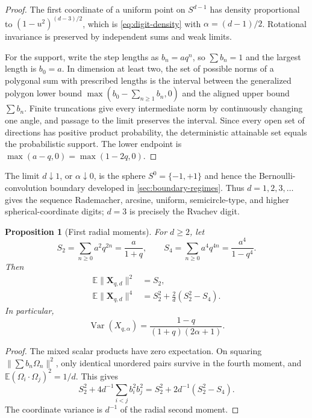 \documentclass[11pt]{article}
\newtheorem{proposition}[theorem]{Proposition}
\theoremstyle{definition}
\theoremstyle{remark}
\newcommand{\E}{\mathbb{E}}
\newcommand{\Var}{\operatorname{Var}}
\begin{document}
\begin{proof}
The first coordinate of a uniform point on \(S^{d-1}\) has density
proportional to \((1-u^2)^{(d-3)/2}\), which is
\eqref{eq:digit-density} with \(\alpha=(d-1)/2\).  Rotational invariance is
preserved by independent sums and weak limits.

For the support, write the step lengths as \(b_n=aq^n\), so
\(\sum b_n=1\) and the largest length is \(b_0=a\).  In dimension at least
two, the set of possible norms of a polygonal sum with prescribed lengths is
the interval between the generalized polygon lower bound
\(\max(b_0-\sum_{n\ge1}b_n,0)\) and the aligned upper bound \(\sum b_n\).
Finite truncations give every intermediate norm by continuously changing one
angle, and passage to the limit preserves the interval.  Since every open
set of directions has positive product probability, the deterministic
attainable set equals the probabilistic support.  The lower endpoint is
\(\max(a-q,0)=\max(1-2q,0)\).
\end{proof}

The limit \(d\downarrow1\), or \(\alpha\downarrow0\), is the sphere
\(S^0=\{-1,+1\}\) and hence the Bernoulli-convolution boundary developed in
\cref{sec:boundary-regimes}.  Thus \(d=1,2,3,\ldots\) gives the sequence
Rademacher, arcsine, uniform, semicircle-type, and higher spherical-coordinate
digits; \(d=3\) is precisely the Rvachev digit.

\begin{proposition}[First radial moments]
\label{prop:radial-moments}
For \(d\ge2\), let
\[
 S_2=\sum_{n\ge0}a^2q^{2n}=\frac{a}{1+q},
 \qquad
 S_4=\sum_{n\ge0}a^4q^{4n}=\frac{a^4}{1-q^4}.
\]
Then
\begin{align}
 \E\|\bm X_{q,d}\|^2&=S_2,\label{eq:radial-second}\\
 \E\|\bm X_{q,d}\|^4&=S_2^2+\frac2d(S_2^2-S_4).
 \label{eq:radial-fourth}
\end{align}
In particular,
\begin{equation}
 \Var(X_{q,\alpha})
 =\frac{1-q}{(1+q)(2\alpha+1)}.
 \label{eq:cascade-variance}
\end{equation}
\end{proposition}

\begin{proof}
The mixed scalar products have zero expectation.  On squaring
\(\|\sum b_n\Omega_n\|^2\), only identical unordered pairs survive in the
fourth moment, and
\(\E(\Omega_i\cdot\Omega_j)^2=1/d\).  This gives
\[
 S_2^2+4d^{-1}\sum_{i<j}b_i^2b_j^2
 =S_2^2+2d^{-1}(S_2^2-S_4).
\]
The coordinate variance is \(d^{-1}\) of the radial second moment.
\end{proof}
\end{document}
